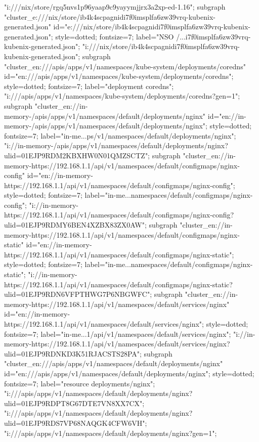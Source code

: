 {{"i:///nix/store/rgq5nvs1p96yaap9c9yayymjjrx3a2xp-ed-1.16";
}
subgraph "cluster_e:///nix/store/ib4k4scpagnidi7f0imsplfa6zw39vrq-kubenix-generated.json" {
id="e:///nix/store/ib4k4scpagnidi7f0imsplfa6zw39vrq-kubenix-generated.json";
style=dotted;
fontsize=7;
label="NSO /...i7f0imsplfa6zw39vrq-kubenix-generated.json";
"i:///nix/store/ib4k4scpagnidi7f0imsplfa6zw39vrq-kubenix-generated.json";
}
subgraph "cluster_en:///apis/apps/v1/namespaces/kube-system/deployments/coredns" {
id="en:///apis/apps/v1/namespaces/kube-system/deployments/coredns";
style=dotted;
fontsize=7;
label="deployment coredns";
"i:///apis/apps/v1/namespaces/kube-system/deployments/coredns?gen=1";
}
subgraph "cluster_en://in-memory-/apis/apps/v1/namespaces/default/deployments/nginx" {
id="en://in-memory-/apis/apps/v1/namespaces/default/deployments/nginx";
style=dotted;
fontsize=7;
label="in-me...ps/v1/namespaces/default/deployments/nginx";
"i://in-memory-/apis/apps/v1/namespaces/default/deployments/nginx?ulid=01EJP9RDM2KBXHW0N01QMZSCTZ";
}
subgraph "cluster_en://in-memory-https://192.168.1.1/api/v1/namespaces/default/configmaps/nginx-config" {
id="en://in-memory-https://192.168.1.1/api/v1/namespaces/default/configmaps/nginx-config";
style=dotted;
fontsize=7;
label="in-me...namespaces/default/configmaps/nginx-config";
"i://in-memory-https://192.168.1.1/api/v1/namespaces/default/configmaps/nginx-config?ulid=01EJP9RDMY6BEN4XZBX83ZX0AW";
}
subgraph "cluster_en://in-memory-https://192.168.1.1/api/v1/namespaces/default/configmaps/nginx-static" {
id="en://in-memory-https://192.168.1.1/api/v1/namespaces/default/configmaps/nginx-static";
style=dotted;
fontsize=7;
label="in-me...namespaces/default/configmaps/nginx-static";
"i://in-memory-https://192.168.1.1/api/v1/namespaces/default/configmaps/nginx-static?ulid=01EJP9RDN6VFPTHWG7P6NBGWFC";
}
subgraph "cluster_en://in-memory-https://192.168.1.1/api/v1/namespaces/default/services/nginx" {
id="en://in-memory-https://192.168.1.1/api/v1/namespaces/default/services/nginx";
style=dotted;
fontsize=7;
label="in-me...1/api/v1/namespaces/default/services/nginx";
"i://in-memory-https://192.168.1.1/api/v1/namespaces/default/services/nginx?ulid=01EJP9RDNKD3K51RJACSTS28PA";
}
subgraph "cluster_en:///apis/apps/v1/namespaces/default/deployments/nginx" {
id="en:///apis/apps/v1/namespaces/default/deployments/nginx";
style=dotted;
fontsize=7;
label="resource deployments/nginx";
"i:///apis/apps/v1/namespaces/default/deployments/nginx?ulid=01EJP9RDPT8G67DTE7VN8XX7CX";
"i:///apis/apps/v1/namespaces/default/deployments/nginx?ulid=01EJP9RDS7VP68NAQGK4CFW6VH";
"i:///apis/apps/v1/namespaces/default/deployments/nginx?gen=1";
}}

